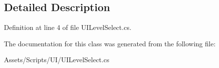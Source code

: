 \subsection{Detailed Description}


Definition at line 4 of file U\+I\+Level\+Select.\+cs.



The documentation for this class was generated from the following file\+:\begin{DoxyCompactItemize}
\item 
Assets/\+Scripts/\+U\+I/U\+I\+Level\+Select.\+cs\end{DoxyCompactItemize}
